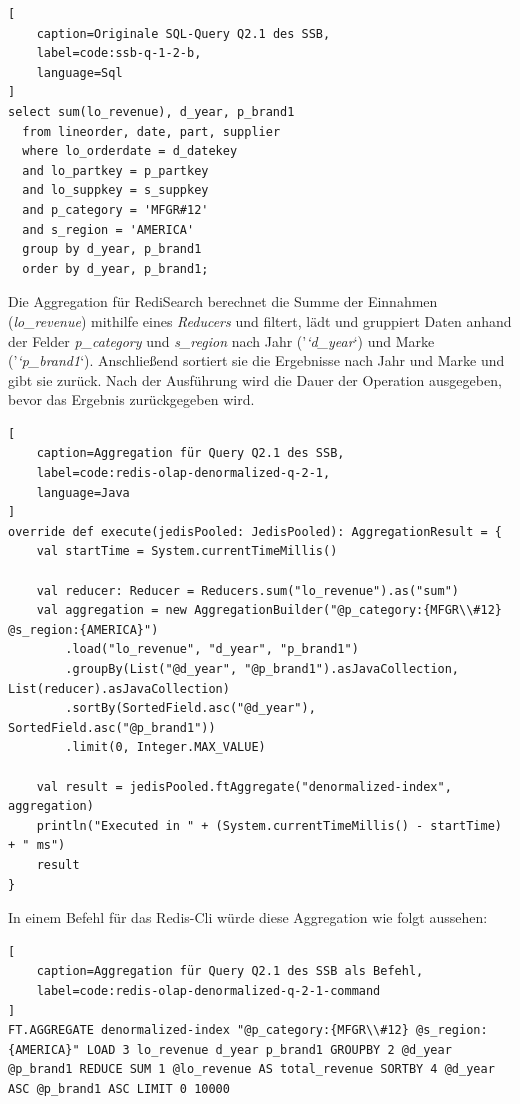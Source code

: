 \begin{lstlisting}[
    caption=Originale SQL-Query Q2.1 des SSB,
    label=code:ssb-q-1-2-b,
    language=Sql
]
select sum(lo_revenue), d_year, p_brand1
  from lineorder, date, part, supplier
  where lo_orderdate = d_datekey
  and lo_partkey = p_partkey
  and lo_suppkey = s_suppkey
  and p_category = 'MFGR#12'
  and s_region = 'AMERICA'
  group by d_year, p_brand1
  order by d_year, p_brand1;
\end{lstlisting}


Die Aggregation für RediSearch berechnet die Summe der Einnahmen (\emph{lo\_revenue}) mithilfe eines \emph{Reducers} und filtert, lädt und gruppiert Daten anhand der Felder \emph{p\_category} und \emph{s\_region} nach Jahr ('\emph{`d\_year}`) und Marke ('\emph{`p\_brand1}`). Anschließend sortiert sie die Ergebnisse nach Jahr und Marke und gibt sie zurück. Nach der Ausführung wird die Dauer der Operation ausgegeben, bevor das Ergebnis zurückgegeben wird.

\begin{lstlisting}[
    caption=Aggregation für Query Q2.1 des SSB,
    label=code:redis-olap-denormalized-q-2-1,
    language=Java
]
override def execute(jedisPooled: JedisPooled): AggregationResult = {
	val startTime = System.currentTimeMillis()

	val reducer: Reducer = Reducers.sum("lo_revenue").as("sum")
	val aggregation = new AggregationBuilder("@p_category:{MFGR\\#12} @s_region:{AMERICA}")
		.load("lo_revenue", "d_year", "p_brand1")
		.groupBy(List("@d_year", "@p_brand1").asJavaCollection, List(reducer).asJavaCollection)
		.sortBy(SortedField.asc("@d_year"), SortedField.asc("@p_brand1"))
		.limit(0, Integer.MAX_VALUE)

	val result = jedisPooled.ftAggregate("denormalized-index", aggregation)
	println("Executed in " + (System.currentTimeMillis() - startTime) + " ms")
	result
}
\end{lstlisting}

In einem Befehl für das Redis-Cli würde diese Aggregation wie folgt aussehen:
\begin{lstlisting}[
    caption=Aggregation für Query Q2.1 des SSB als Befehl,
    label=code:redis-olap-denormalized-q-2-1-command
]
FT.AGGREGATE denormalized-index "@p_category:{MFGR\\#12} @s_region:{AMERICA}" LOAD 3 lo_revenue d_year p_brand1 GROUPBY 2 @d_year @p_brand1 REDUCE SUM 1 @lo_revenue AS total_revenue SORTBY 4 @d_year ASC @p_brand1 ASC LIMIT 0 10000
\end{lstlisting}


